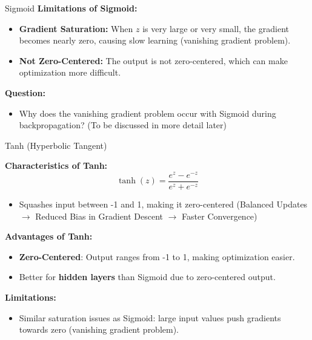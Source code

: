 \documentclass[serif, aspectratio=169]{beamer}
\begin{document}
\begin{frame}{Sigmoid}
    \textbf{Limitations of Sigmoid:}
    \begin{itemize}
        \item \textbf{Gradient Saturation:} When \( z \) is very large or very small, the gradient becomes nearly zero, causing slow learning (vanishing gradient problem).
        \item \textbf{Not Zero-Centered:} The output is not zero-centered, which can make optimization more difficult.
    \end{itemize}

    \textbf{Question:}
    \begin{itemize}
        \item Why does the vanishing gradient problem occur with Sigmoid during backpropagation? (To be discussed in more detail later)
    \end{itemize}
\end{frame}

\begin{frame}{Tanh (Hyperbolic Tangent)}

    \textbf{Characteristics of Tanh:}
    \begin{equation*}
        \tanh(z) = \frac{e^z - e^{-z}}{e^z + e^{-z}}
    \end{equation*}
    \begin{itemize}
        \item Squashes input between -1 and 1, making it zero-centered (Balanced Updates $\rightarrow$ Reduced Bias in Gradient Descent $\rightarrow$ Faster Convergence)
    \end{itemize}

    \textbf{Advantages of Tanh:}
    \begin{itemize}
        \item \textbf{Zero-Centered}: Output ranges from -1 to 1, making optimization easier.
        \item Better for \textbf{hidden layers} than Sigmoid due to zero-centered output.
    \end{itemize}

    \textbf{Limitations:}
    \begin{itemize}
        \item Similar saturation issues as Sigmoid: large input values push gradients towards zero (vanishing gradient problem).
    \end{itemize}

\end{frame}
\end{document}
